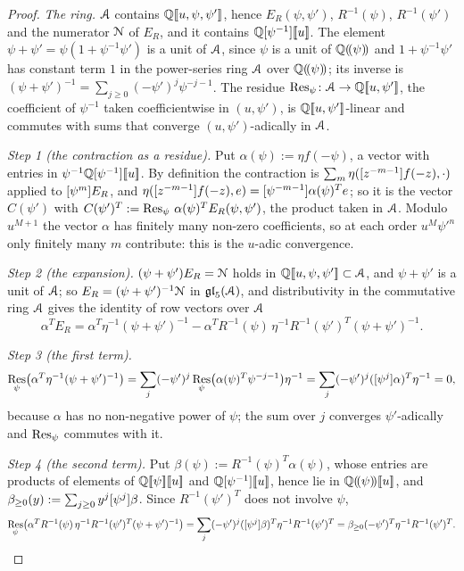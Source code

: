 \begin{proof}
\emph{The ring.} $\mathcal{A}$ contains $\mathbb{Q}[\![ u,\psi,\psi' ]\!]$, hence $E_R(\psi,\psi')$, $R^{-1}(\psi)$, $R^{-1}(\psi')$ and the numerator $\mathcal{N}$ of $E_R$, and it contains $\mathbb{Q}[\psi^{-1}][\![ u ]\!]$. The element $\psi+\psi' = \psi(1+\psi^{-1}\psi')$ is a unit of $\mathcal{A}$, since $\psi$ is a unit of $\mathbb{Q}(\!(\psi)\!)$ and $1+\psi^{-1}\psi'$ has constant term $1$ in the power-series ring $\mathcal{A}$ over $\mathbb{Q}(\!(\psi)\!)$; its inverse is $(\psi+\psi')^{-1} = \sum_{j\geq 0}(-\psi')^j\psi^{-j-1}$. The residue $\operatorname*{Res}_\psi\colon\mathcal{A}\to\mathbb{Q}[\![ u,\psi' ]\!]$, the coefficient of $\psi^{-1}$ taken coefficientwise in $(u,\psi')$, is $\mathbb{Q}[\![ u,\psi' ]\!]$-linear and commutes with sums that converge $(u,\psi')$-adically in $\mathcal{A}$.

\emph{Step 1 (the contraction as a residue).} Put $\alpha(\psi) := \eta f(-\psi)$, a vector with entries in $\psi^{-1}\mathbb{Q}[\psi^{-1}][\![ u ]\!]$. By definition the contraction is $\sum_m\eta([z^{-m-1}]f(-z),\cdot)$ applied to $[\psi^m]E_R$, and $\eta([z^{-m-1}]f(-z),e) = [\psi^{-m-1}]\alpha(\psi)^Te$; so it is the vector $C(\psi')$ with $C(\psi')^T := \operatorname*{Res}_\psi\,\alpha(\psi)^TE_R(\psi,\psi')$, the product taken in $\mathcal{A}$. Modulo $u^{M+1}$ the vector $\alpha$ has finitely many non-zero coefficients, so at each order $u^M\psi'^n$ only finitely many $m$ contribute: this is the $u$-adic convergence.

\emph{Step 2 (the expansion).} $(\psi+\psi')E_R = \mathcal{N}$ holds in $\mathbb{Q}[\![ u,\psi,\psi' ]\!]\subset\mathcal{A}$, and $\psi+\psi'$ is a unit of $\mathcal{A}$; so $E_R = (\psi+\psi')^{-1}\mathcal{N}$ in $\mathfrak{gl}_5(\mathcal{A})$, and distributivity in the commutative ring $\mathcal{A}$ gives the identity of row vectors over $\mathcal{A}$
\[
\alpha^TE_R = \alpha^T\eta^{-1}(\psi+\psi')^{-1}-\alpha^TR^{-1}(\psi)\,\eta^{-1}R^{-1}(\psi')^T(\psi+\psi')^{-1} .
\]

\emph{Step 3 (the first term).}
\[
\operatorname*{Res}_\psi\bigl(\alpha^T\eta^{-1}(\psi+\psi')^{-1}\bigr) = \sum_j(-\psi')^j\operatorname*{Res}_\psi\bigl(\alpha(\psi)^T\psi^{-j-1}\bigr)\eta^{-1} = \sum_j(-\psi')^j([\psi^j]\alpha)^T\eta^{-1} = 0,
\]
because $\alpha$ has no non-negative power of $\psi$; the sum over $j$ converges $\psi'$-adically and $\operatorname*{Res}_\psi$ commutes with it.

\emph{Step 4 (the second term).} Put $\beta(\psi) := R^{-1}(\psi)^T\alpha(\psi)$, whose entries are products of elements of $\mathbb{Q}[\![ \psi ]\!][\![ u ]\!]$ and $\mathbb{Q}[\psi^{-1}][\![ u ]\!]$, hence lie in $\mathbb{Q}(\!(\psi)\!)[\![ u ]\!]$, and $\beta_{\geq 0}(y) := \sum_{j\geq 0}y^j[\psi^j]\beta$. Since $R^{-1}(\psi')^T$ does not involve $\psi$,
\[
\operatorname*{Res}_\psi\bigl(\alpha^TR^{-1}(\psi)\,\eta^{-1}R^{-1}(\psi')^T(\psi+\psi')^{-1}\bigr) = \sum_j(-\psi')^j([\psi^j]\beta)^T\eta^{-1}R^{-1}(\psi')^T = \beta_{\geq 0}(-\psi')^T\eta^{-1}R^{-1}(\psi')^T .
\]


\end{proof}
